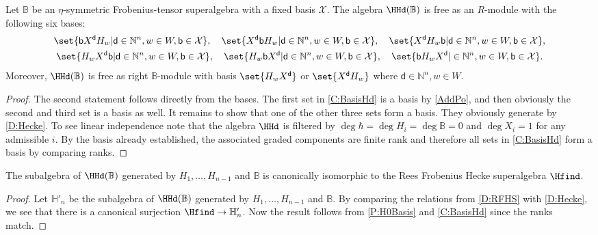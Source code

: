 \documentclass[a4paper,11pt]{amsart}
\numberwithin{equation}{subsection}
\theoremstyle{definition}
\theoremstyle{theorem}
\theoremstyle{remark}
\newcommand\HH{\mathbb{H}}
\newcommand\Sym{W}
\newcommand\bd{\mathsf{d}}
\newcommand\bb{\mathsf{b}}
\newcommand\N{\mathbb{N}}
\newcommand{\Bo}{\mathbb{B}}
\begin{document}
\begin{Theorem}\label{C:BasisHd}
     Let $\Bo$ be an $\eta$-symmetric Frobenius-tensor superalgebra with
     a fixed basis $\mathcal{X}$. The algebra $\HHd(\Bo)$ is free as an
     $R$-module with the following six bases:
     \begin{equation*}
     \begin{gathered}
        \set{\bb X^\bd  H_w| \bd\in\N^n, w\in\Sym, \bb\in\mathcal{X}},\quad \set{ X^\bd  \bb H_w| \bd\in\N^n, w\in\Sym, \bb\in\mathcal{X}},\quad  \set{ X^\bd  H_w\bb| \bd\in\N^n, w\in\Sym,\bb\in\mathcal{X}},
        \\
           \set{H_w X^\bd \bb| \bd\in\N^n, w\in\Sym, \bb\in\mathcal{X}},
           \quad\set{H_w \bb X^\bd | \bd\in\N^n, w\in\Sym, \bb\in\mathcal{X}}, \quad  \set{ \bb H_w X^\bd | \in\N^n, w\in\Sym, \bb\in\mathcal{X}}.
     \end{gathered}
    \end{equation*}
    Moreover, $\HHd(\Bo)$ is free as right $\Bo$-module with basis
    $\set{H_w X^\bd}$ or  $\set{ X^\bd  H_w}$ where $\bd\in\N^n, w\in\Sym$.
  \end{Theorem}

  \begin{proof}
 The second statement follows directly from the bases. The first set in \autoref{C:BasisHd} is a basis by  \autoref{AddPo}, and then obviously the second and third set is a basis as well. It remains to show that one of the other three sets form a basis. They obviously generate by \autoref{D:Hecke}. To see linear independence note that the algebra $\HHd$ is filtered by $\deg\hbar=\deg H_i=\deg \Bo=0$ and $\deg X_i=1$ for any admissible $i$. By the basis already established, the associated graded components are finite rank and therefore all sets in \autoref{C:BasisHd} form a basis by comparing ranks.
 \end{proof}

\begin{Corollary}\label{matchRFH}
  The subalgebra of $\HHd(\Bo)$ generated by $H_1,\dots,H_{n-1}$ and
  $\Bo$ is canonically isomorphic to the Rees Frobenius Hecke superalgebra $\Hfind$.
\end{Corollary}

\begin{proof}
  Let $\HH'_n$ be the subalgebra of $\HHd(\Bo)$ generated by
  $H_1,\dots,H_{n-1}$ and
  $\Bo$. By comparing  the relations from  \autoref{D:RFHS} with  \autoref{D:Hecke},
  we see that there is a canonical surjection $\Hfind\to\HH'_n$. Now the result follows
  from \autoref{P:H0Basis} and \autoref{C:BasisHd} since  the ranks match.
\end{proof}
\end{document}
